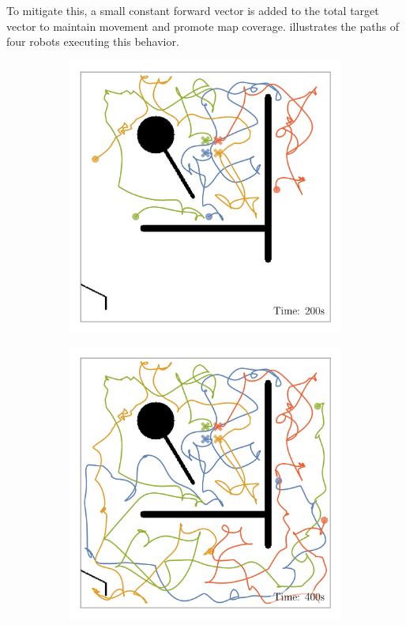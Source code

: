 To mitigate this, a small constant forward vector is added to the total target vector to maintain movement and promote map coverage.  illustrates the paths of four robots executing this behavior.

\def\w{0.329\textwidth}
\begin{figure}[H]
    \centering
    \begin{subfigure}[b]{\w}
        \centering
        \includegraphics[width=\textwidth]{./figures/plots/paths/search:gradient-paths-(after-200s).png}
    \end{subfigure}
    \begin{subfigure}[b]{\w}
        \centering
        \includegraphics[width=\textwidth]{./figures/plots/paths/search:gradient-paths-(after-400s).png}

\end{subfigure}
\end{figure}
